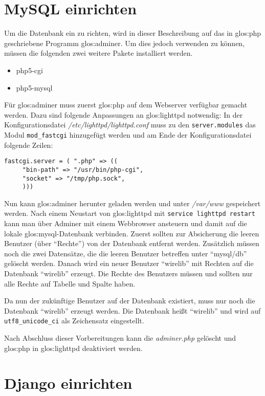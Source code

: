 \section{MySQL einrichten}
Um die Datenbank ein zu richten, wird in dieser Beschreibung auf das in
\Gls{glos:php} geschriebene Programm \Gls{glos:adminer}. Um dies jedoch
verwenden zu können, müssen die folgenden zwei weitere Pakete installiert
werden.

\begin{itemize}
  \item php5-cgi
  \item php5-mysql
\end{itemize}

Für \Gls{glos:adminer} muss zuerst \Gls{glos:php} auf dem Webserver verfügbar
gemacht werden. Dazu sind folgende Anpassungen an \Gls{glos:lighttpd}
notwendig:
In der Konfigurationsdatei \emph{/etc/lighttpd/lighttpd.conf} muss zu den
\lstinline{server.modules} das Modul \lstinline{mod_fastcgi} hinzugefügt
werden und am Ende der Konfigurationsdatei folgende Zeilen:

\begin{lstlisting}
fastcgi.server = ( ".php" => (( 
     "bin-path" => "/usr/bin/php-cgi",
     "socket" => "/tmp/php.sock",
     )))
\end{lstlisting}

Nun kann \Gls{glos:adminer} herunter geladen werden und unter \emph{/var/www}
gespeichert werden. Nach einem Neustart von \Gls{glos:lighttpd} mit
\lstinline{service lighttpd restart} kann man über Adminer mit einem Webbrowser
ansteuern und damit auf die lokale \Gls{glos:mysql}-Datenbank verbinden. Zuerst
sollten zur Absicherung die leeren Benutzer (über "`Rechte"') von der Datenbank
entfernt werden. Zusätzlich müssen noch die zwei Datensätze, die die leeren
Benutzer betreffen unter "`mysql/db"' gelöscht werden.  Danach wird ein neuer
Benutzer "`wirelib"' mit Rechten auf die Datenbank "`wirelib"' erzeugt. Die
Rechte des Benutzers müssen und sollten nur alle Rechte auf Tabelle und Spalte
haben.

Da nun der zukünftige Benutzer auf der Datenbank existiert, muss nur noch die
Datenbank "`wirelib"' erzeugt werden. Die Datenbank heißt "`wirelib"' und
wird auf \lstinline{utf8_unicode_ci} als Zeichensatz eingestellt.

Nach Abschluss dieser Vorbereitungen kann die \emph{adminer.php} gelöscht und
\Gls{glos:php} in \Gls{glos:lighttpd} deaktiviert werden.

\section{Django einrichten}

